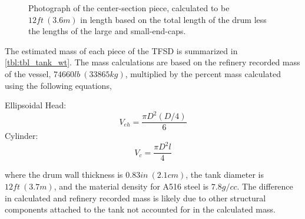 \documentclass[10pt,parskip=half,
toc=sectionentrywithdots,
bibliography=totocnumbered,
captions=tableheading,numbers=noendperiod]{scrartcl}
\begin{document}
\begin{figure}[H]
\hypertarget{fig:fillet}{%
\begin{center}
\end{center}
\caption{Photograph of the center-section piece, calculated to be
\(12ft\:(3.6m)\) in length based on the total length of the drum less
the lengths of the large and small-end-caps.\cite{Malone2019a}}\label{fig:fillet}
}
\end{figure}

The estimated mass of each piece of the TFSD is summarized in
\cref{tbl:tbl_tank_wt}. The mass calculations are based on the refinery
recorded mass of the vessel, \(74660lb\:(33865kg)\), multiplied by the
percent mass calculated using the following equations,

Ellipsoidal Head:
\begin{equation}V_{eh}=\frac{\pi D^2 (D/4)}{6}\end{equation} Cylinder:
\begin{equation}V_c = \frac{\pi D^2 l}{4}\end{equation}

where the drum wall thickness is \(0.83in\:(2.1cm)\), the tank diameter
is \(12ft\:(3.7m)\), and the material density for A516 steel is
\(7.8g/cc\)\cite{Malone2019}. The difference in calculated and refinery
recorded mass is likely due to other structural components attached to
the tank not accounted for in the calculated mass.
\end{document}

